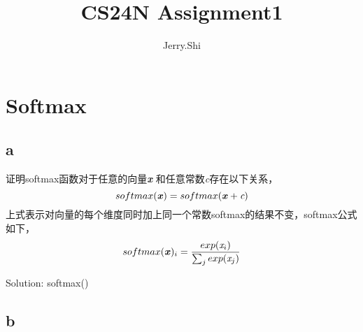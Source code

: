 \documentclass[twoside,nofonts,fancyhdr,openany,UTF8]{ctexart} %
\title{CS24N Assignment1}    	%
\author{Jerry.Shi}		%
\begin{document}



\section{Softmax}
\subsection{a}
证明softmax函数对于任意的向量\textbf{\emph{x}} 和任意常数\emph{c}存在以下关系，
\begin{equation}
softmax(\textbf{\emph{x}}) = softmax(\textbf{\emph{x}} + \emph{c})
\end{equation}
上式表示对向量的每个维度同时加上同一个常数softmax的结果不变，softmax公式如下，
\begin{equation}
softmax(\textbf{\emph{x}})_i = \frac{exp(\emph{x}_i)}{\sum_{j}exp(\emph{x}_j)}
\end{equation}

Solution:
softmax(\text)

\subsection{b}
\end{document}
